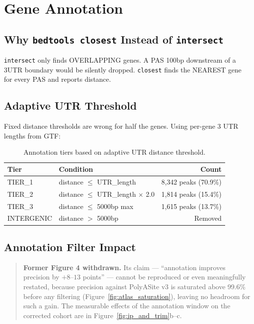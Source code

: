 \documentclass[11pt,a4paper]{article}
\begin{document}
\section{Gene Annotation}
\label{sec:annotation}

\subsection{Why \texttt{bedtools closest} Instead of \texttt{intersect}}

\texttt{intersect} only finds OVERLAPPING genes. A PAS 100bp downstream of a
3\textquotesingle UTR boundary would be silently dropped. \texttt{closest} finds the
NEAREST gene for every PAS and reports distance.

\subsection{Adaptive UTR Threshold}

Fixed distance thresholds are wrong for half the genes. Using per-gene 3\textquotesingle
UTR lengths from GTF:

\begin{table}[htbp]
  \centering
  \caption{Annotation tiers based on adaptive UTR distance threshold.}
  \label{tab:annotation_tiers}
  \begin{tabular}{llr}
    \toprule
    \textbf{Tier} & \textbf{Condition} & \textbf{Count} \\
    \midrule
    TIER\_1    & distance $\leq$ UTR\_length              & 8,342 peaks (70.9\%) \\
    TIER\_2    & distance $\leq$ UTR\_length $\times$ 2.0 & 1,814 peaks (15.4\%) \\
    TIER\_3    & distance $\leq$ 5000bp max               & 1,615 peaks (13.7\%) \\
    INTERGENIC & distance $>$ 5000bp                      & Removed \\
    \bottomrule
  \end{tabular}
\end{table}

\subsection{Annotation Filter Impact}

\begin{quote}
\textbf{Former Figure 4 withdrawn.} Its claim --- ``annotation improves precision
by $+8$--$13$ points'' --- cannot be reproduced or even meaningfully restated,
because precision against PolyASite v3 is saturated above 99.6\% before any
filtering (Figure~\ref{fig:atlas_saturation}), leaving no headroom for such a gain.
The measurable effects of the annotation window on the corrected cohort are in
Figure~\ref{fig:ip_and_trim}b--c.
\end{quote}
\end{document}
